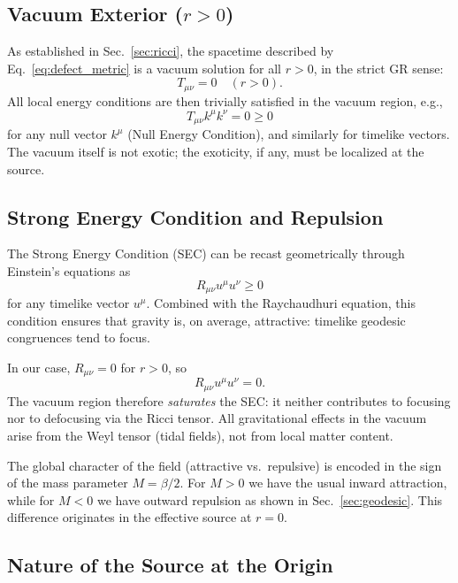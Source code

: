 \documentclass[%
  reprint,
  superscriptaddress,
  showpacs,
  showkeys,
  amsmath,amssymb,
  pra,
  longbibliography,
  floatfix,
  x11names
]{revtex4-2}
\begin{document}
\subsection{Vacuum Exterior ($r > 0$)}

As established in Sec.~\ref{sec:ricci}, the spacetime described by Eq.~\eqref{eq:defect_metric} is a vacuum solution for all \(r>0\), in the strict GR sense:
\begin{equation}
T_{\mu\nu} = 0 \quad (r>0).
\end{equation}
All local energy conditions are then trivially satisfied in the vacuum region, e.g.,
\begin{equation}
T_{\mu\nu} k^\mu k^\nu = 0 \ge 0
\end{equation}
for any null vector \(k^\mu\) (Null Energy Condition), and similarly for timelike vectors. The vacuum itself is not exotic; the exoticity, if any, must be localized at the source.

\subsection{Strong Energy Condition and Repulsion}

The Strong Energy Condition (SEC) can be recast geometrically through Einstein's equations as
\begin{equation}
R_{\mu\nu}u^\mu u^\nu \ge 0
\end{equation}
for any timelike vector \(u^\mu\). Combined with the Raychaudhuri equation, this condition ensures that gravity is, on average, attractive: timelike geodesic congruences tend to focus.

In our case, \(R_{\mu\nu}=0\) for \(r>0\), so
\begin{equation}
R_{\mu\nu}u^\mu u^\nu = 0.
\end{equation}
The vacuum region therefore \emph{saturates} the SEC: it neither contributes to focusing nor to defocusing via the Ricci tensor. All gravitational effects in the vacuum arise from the Weyl tensor (tidal fields), not from local matter content.

The global character of the field (attractive vs.\ repulsive) is encoded in the sign of the mass parameter \(M=\beta/2\). For \(M>0\) we have the usual inward attraction, while for \(M<0\) we have outward repulsion as shown in Sec.~\ref{sec:geodesic}. This difference originates in the effective source at \(r=0\).

\subsection{Nature of the Source at the Origin}
\end{document}
